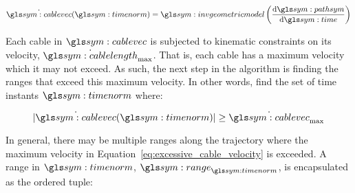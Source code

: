 		\begin{equation}
			\dot{\cablevec}(\timenorm) =
				\invgeometricmodel
				\left(
					\frac
					{%
						\der\pathsym
					}
					{%
						\der\timesym
					}
				\right)
		\end{equation}

		Each cable in $\cablevec$ is subjected to kinematic constraints on its
		velocity, $\dot\cablelength_{\max}$.  That is, each cable has a maximum velocity which
		it may not exceed. As such, the next step in the algorithm is finding
		the ranges that exceed this maximum velocity. In other words, find the
		set of time instants $\timenorm$ where:

		\begin{equation}
			\abs{\dot{\cablevec}(\timenorm)} \geq \dot{\cablevec}_{\max}
			\label{eq:excessive_cable_velocity}
		\end{equation}

		In general, there may be multiple ranges along the trajectory where the
		maximum velocity in Equation~\ref{eq:excessive_cable_velocity} is
		exceeded. A range in $\timenorm$, $\rangetimenorm$, is encapsulated as
		the ordered tuple:






